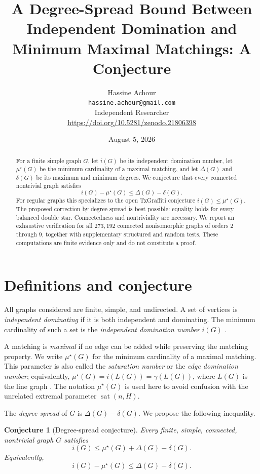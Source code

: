 \documentclass[11pt]{article}
\title{A Degree-Spread Bound Between Independent Domination and Minimum Maximal Matchings: A Conjecture}
\author{Hassine Achour\\\texttt{hassine.achour@gmail.com}\\
\small Independent Researcher\\
\small\url{https://doi.org/10.5281/zenodo.21806398}}
\date{August 5, 2026}
\newtheorem{conjecture}{Conjecture}
\newcommand{\mustar}{\mu^{\star}}
\begin{document}
\maketitle

\begin{abstract}
For a finite simple graph $G$, let $i(G)$ be its independent domination number, let $\mustar(G)$ be the minimum cardinality of a maximal matching, and let $\Delta(G)$ and $\delta(G)$ be its maximum and minimum degrees. We conjecture that every connected nontrivial graph satisfies
\[
 i(G)-\mustar(G)\leq \Delta(G)-\delta(G).
\]
For regular graphs this specializes to the open TxGraffiti conjecture $i(G)\leq\mustar(G)$. The proposed correction by degree spread is best possible: equality holds for every balanced double star. Connectedness and nontriviality are necessary. We report an exhaustive verification for all $273{,}192$ connected nonisomorphic graphs of orders $2$ through $9$, together with supplementary structured and random tests. These computations are finite evidence only and do not constitute a proof.
\end{abstract}

\section{Definitions and conjecture}
All graphs considered are finite, simple, and undirected. A set of vertices is \emph{independent dominating} if it is both independent and dominating. The minimum cardinality of such a set is the \emph{independent domination number} $i(G)$ \cite{goddard2013}.

A matching is \emph{maximal} if no edge can be added while preserving the matching property. We write $\mustar(G)$ for the minimum cardinality of a maximal matching. This parameter is also called the \emph{saturation number} or the \emph{edge domination number}; equivalently, $\mustar(G)=i(L(G))=\gamma(L(G))$, where $L(G)$ is the line graph \cite{tavakoli2023}. The notation $\mustar(G)$ is used here to avoid confusion with the unrelated extremal parameter $\operatorname{sat}(n,H)$.

The \emph{degree spread} of $G$ is $\Delta(G)-\delta(G)$. We propose the following inequality.

\begin{conjecture}[Degree-spread conjecture]\label{conj:main}
Every finite, simple, connected, nontrivial graph $G$ satisfies
\begin{equation}\label{eq:main}
 \boxed{\quad i(G)\leq \mustar(G)+\Delta(G)-\delta(G).\quad}
\end{equation}
Equivalently,
\[
 i(G)-\mustar(G)\leq\Delta(G)-\delta(G).
\]
\end{conjecture}
\end{document}
